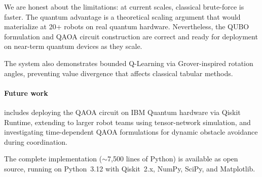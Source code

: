\documentclass[conference]{IEEEtran}
\begin{document}
We are honest about the limitations: at current scales, classical brute-force is faster. The quantum advantage is a theoretical scaling argument that would materialize at 20+ robots on real quantum hardware. Nevertheless, the QUBO formulation and QAOA circuit construction are correct and ready for deployment on near-term quantum devices as they scale.

The system also demonstrates bounded Q-Learning via Grover-inspired rotation angles, preventing value divergence that affects classical tabular methods.

\paragraph{Future work} includes deploying the QAOA circuit on IBM Quantum hardware via Qiskit Runtime, extending to larger robot teams using tensor-network simulation, and investigating time-dependent QAOA formulations for dynamic obstacle avoidance during coordination.

The complete implementation ($\sim$7,500 lines of Python) is available as open source, running on Python~3.12 with Qiskit~2.x, NumPy, SciPy, and Matplotlib.

\end{document}
